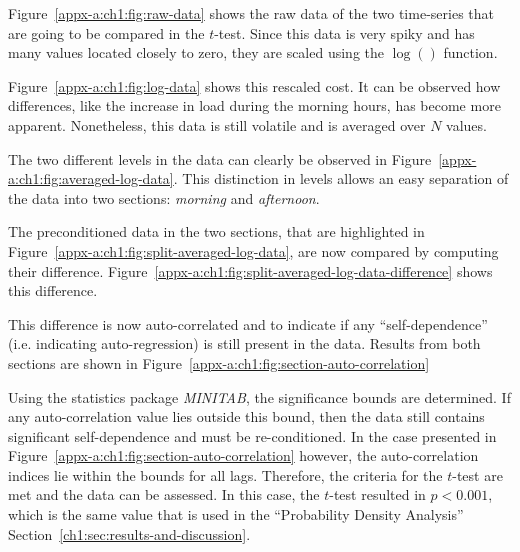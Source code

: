 

Figure~\ref{appx-a:ch1:fig:raw-data} shows the raw data of the two time-series that are going to be compared in the $t$-test.
Since this data is very spiky and has many values located closely to zero, they are scaled using the $\log()$ function.



Figure~\ref{appx-a:ch1:fig:log-data} shows this rescaled cost.
It can be observed how differences, like the increase in load during the morning hours, has become more apparent.
Nonetheless, this data is still volatile and is averaged over $N$ values.



The two different levels in the data can clearly be observed in Figure~\ref{appx-a:ch1:fig:averaged-log-data}.
This distinction in levels allows an easy separation of the data into two sections: \textit{morning} and \textit{afternoon}.



The preconditioned data in the two sections, that are highlighted in Figure~\ref{appx-a:ch1:fig:split-averaged-log-data}, are now compared by computing their difference.
Figure~\ref{appx-a:ch1:fig:split-averaged-log-data-difference} shows this difference.



This difference is now auto-correlated and to indicate if any ``self-dependence'' (i.e. indicating auto-regression) is still present in the data.
Results from both sections are shown in Figure~\ref{appx-a:ch1:fig:section-auto-correlation}



Using the statistics package \textit{MINITAB}, the significance bounds are determined.
If any auto-correlation value lies outside this bound, then the data still contains significant self-dependence and must be re-conditioned.
In the case presented in Figure~\ref{appx-a:ch1:fig:section-auto-correlation} however, the auto-correlation indices lie within the bounds for all lags.
Therefore, the criteria for the $t$-test are met and the data can be assessed.
In this case, the $t$-test resulted in $p<0.001$, which is the same value that is used in the ``Probability Density Analysis'' Section~\ref{ch1:sec:results-and-discussion}.





